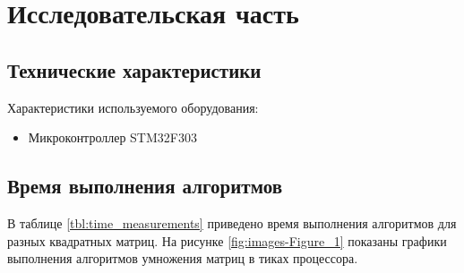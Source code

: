 \chapter{Исследовательская часть}


\section{Технические характеристики}

Характеристики используемого оборудования:
\begin{itemize}
    \item Микроконтроллер STM32F303 \cite{bib1}
\end{itemize}

\section{Время выполнения алгоритмов}

В таблице \ref{tbl:time_measurements} приведено время выполнения алгоритмов для разных
квадратных матриц. На рисунке \ref{fig:images-Figure_1} показаны графики
выполнения алгоритмов умножения матриц в тиках процессора.

